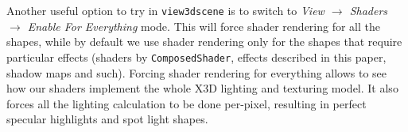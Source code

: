 \documentclass{acmsiggraph}                     %
\newcommand*{\myhref}[2]{\texttt{\href{#1}{\nolinkurl{#2}}}}
\begin{document}
Another useful option to try in \texttt{view3dscene} is to switch to
\textit{View $\rightarrow$ Shaders $\rightarrow$ Enable For Everything} mode.
This will force shader rendering for all the shapes,
while by default we use shader rendering only for the shapes that
require particular effects (shaders by \texttt{ComposedShader}, effects
described in this paper, shadow maps and such).
Forcing shader rendering for everything allows to see
how our shaders implement the whole X3D lighting and texturing model.
It also forces all the lighting calculation to be done per-pixel, resulting
in perfect specular highlights and spot light shapes.




\end{document}
